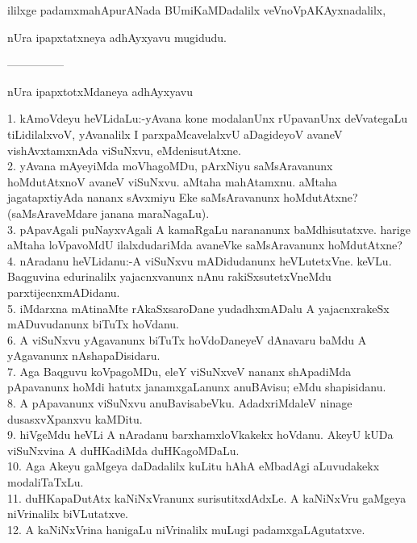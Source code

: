 \documentclass{article}
\begin{document}
\begin{center}
ililxge padamxmahApurANada BUmiKaMDadalilx veVnoVpAKAyxnadalilx,
\end{center}

\begin{center}
nUra ipapxtatxneya adhAyxyavu mugidudu.
\end{center}

\begin{center}
---------------
\end{center}

\begin{center}
nUra ipapxtotxMdaneya adhAyxyavu
\end{center}

1. kAmoVdeyu heVLidaLu:-yAvana kone modalanUnx rUpavanUnx deVvategaLu tiLidilalxvoV, yAvanalilx I parxpaMcavelalxvU aDagideyoV avaneV vishAvxtamxnAda viSuNxvu, eMdenisutAtxne.\\
2. yAvana mAyeyiMda moVhagoMDu, pArxNiyu saMsAravanunx hoMdutAtxnoV avaneV viSuNxvu. aMtaha mahAtamxnu. aMtaha jagatapxtiyAda nananx sAvxmiyu Eke saMsAravanunx hoMdutAtxne? (saMsAraveMdare janana maraNagaLu).\\
3. pApavAgali puNayxvAgali A kamaRgaLu narananunx baMdhisutatxve. harige aMtaha loVpavoMdU ilalxdudariMda avaneVke saMsAravanunx hoMdutAtxne?\\
4. nAradanu heVLidanu:-A viSuNxvu mADidudanunx heVLutetxVne. keVLu. Baqguvina edurinalilx yajacnxvanunx nAnu rakiSxsutetxVneMdu parxtijecnxmADidanu.\\
5. iMdarxna mAtinaMte rAkaSxsaroDane yudadhxmADalu A yajacnxrakeSx mADuvudanunx biTuTx hoVdanu.\\
6. A viSuNxvu yAgavanunx biTuTx hoVdoDaneyeV dAnavaru baMdu A yAgavanunx nAshapaDisidaru.\\
7. Aga Baqguvu koVpagoMDu, eleY viSuNxveV nananx shApadiMda pApavanunx hoMdi hatutx janamxgaLanunx anuBAvisu; eMdu shapisidanu.\\
8. A pApavanunx viSuNxvu anuBavisabeVku. AdadxriMdaleV ninage dusasxvXpanxvu kaMDitu.\\
9. hiVgeMdu heVLi A nAradanu barxhamxloVkakekx hoVdanu. AkeyU kUDa viSuNxvina A duHKadiMda duHKagoMDaLu.\\
10. Aga Akeyu gaMgeya daDadalilx kuLitu hAhA eMbadAgi aLuvudakekx modaliTaTxLu.\\
11. duHKapaDutAtx kaNiNxVranunx surisutitxdAdxLe. A kaNiNxVru gaMgeya niVrinalilx biVLutatxve.\\
12. A kaNiNxVrina hanigaLu niVrinalilx muLugi padamxgaLAgutatxve.\\
\end{document}
